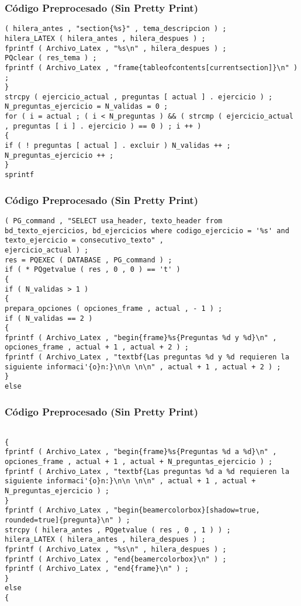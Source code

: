 \documentclass{beamer}
\begin{document}
\begin{frame}[fragile]
\frametitle{C\'odigo Preprocesado (Sin Pretty Print)}
\begin{lstlisting}[style=CStyle]
( hilera_antes , "section{%s}" , tema_descripcion ) ; 
hilera_LATEX ( hilera_antes , hilera_despues ) ; 
fprintf ( Archivo_Latex , "%s\n" , hilera_despues ) ; 
PQclear ( res_tema ) ; 
fprintf ( Archivo_Latex , "frame{tableofcontents[currentsection]}\n" ) ; 
} 
strcpy ( ejercicio_actual , preguntas [ actual ] . ejercicio ) ; 
N_preguntas_ejercicio = N_validas = 0 ; 
for ( i = actual ; ( i < N_preguntas ) && ( strcmp ( ejercicio_actual , preguntas [ i ] . ejercicio ) == 0 ) ; i ++ ) 
{ 
if ( ! preguntas [ actual ] . excluir ) N_validas ++ ; 
N_preguntas_ejercicio ++ ; 
} 
sprintf \end{lstlisting}
\end{frame}
\begin{frame}[fragile]
\frametitle{C\'odigo Preprocesado (Sin Pretty Print)}
\begin{lstlisting}[style=CStyle]
( PG_command , "SELECT usa_header, texto_header from bd_texto_ejercicios, bd_ejercicios where codigo_ejercicio = '%s' and texto_ejercicio = consecutivo_texto" , 
ejercicio_actual ) ; 
res = PQEXEC ( DATABASE , PG_command ) ; 
if ( * PQgetvalue ( res , 0 , 0 ) == 't' ) 
{ 
if ( N_validas > 1 ) 
{ 
prepara_opciones ( opciones_frame , actual , - 1 ) ; 
if ( N_validas == 2 ) 
{ 
fprintf ( Archivo_Latex , "begin{frame}%s{Preguntas %d y %d}\n" , opciones_frame , actual + 1 , actual + 2 ) ; 
fprintf ( Archivo_Latex , "textbf{Las preguntas %d y %d requieren la siguiente informaci'{o}n:}\n\n \n\n" , actual + 1 , actual + 2 ) ; 
} 
else \end{lstlisting}
\end{frame}
\begin{frame}[fragile]
\frametitle{C\'odigo Preprocesado (Sin Pretty Print)}
\begin{lstlisting}[style=CStyle]

{ 
fprintf ( Archivo_Latex , "begin{frame}%s{Preguntas %d a %d}\n" , opciones_frame , actual + 1 , actual + N_preguntas_ejercicio ) ; 
fprintf ( Archivo_Latex , "textbf{Las preguntas %d a %d requieren la siguiente informaci'{o}n:}\n\n \n\n" , actual + 1 , actual + N_preguntas_ejercicio ) ; 
} 
fprintf ( Archivo_Latex , "begin{beamercolorbox}[shadow=true, rounded=true]{pregunta}\n" ) ; 
strcpy ( hilera_antes , PQgetvalue ( res , 0 , 1 ) ) ; 
hilera_LATEX ( hilera_antes , hilera_despues ) ; 
fprintf ( Archivo_Latex , "%s\n" , hilera_despues ) ; 
fprintf ( Archivo_Latex , "end{beamercolorbox}\n" ) ; 
fprintf ( Archivo_Latex , "end{frame}\n" ) ; 
} 
else 
{ \end{lstlisting}
\end{frame}
\end{document}
